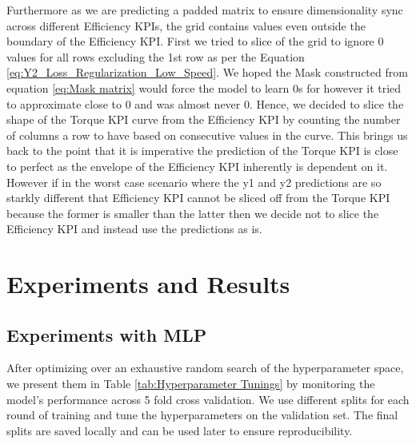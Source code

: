 \documentclass{report} %
\begin{document}
Furthermore as we are predicting a padded matrix to ensure dimensionality sync across different Efficiency \ac{KPI}s, the grid contains values even outside the boundary of the Efficiency \ac{KPI}.
First we tried to slice of the grid to ignore 0 values for all rows excluding the 1st row as per the Equation \ref{eq:Y2_Loss_Regularization_Low_Speed}.
We hoped the Mask constructed from equation \ref{eq:Mask matrix} would force the model to learn 0s for however it tried to approximate close to 0 and was almost never 0.
Hence, we decided to slice the shape of the Torque \ac{KPI} curve from the Efficiency \ac{KPI} by counting the number of columns a row to have based on consecutive values in the curve.
This brings us back to the point that it is imperative the prediction of the Torque \ac{KPI} is close to perfect as the envelope of the Efficiency \ac{KPI} inherently is dependent on it.
However if in the worst case scenario where the y1 and y2 predictions are so starkly different that Efficiency \ac{KPI} cannot be sliced off from 
the Torque \ac{KPI} because the former is smaller than the latter then we decide not to slice the Efficiency \ac{KPI} and instead use the predictions as is.

\newpage 
\newpage 

\chapter{Experiments and Results}

\section{Experiments with \ac{MLP}}\label{sec:Experiments with MLP}

After optimizing over an exhaustive random search of the hyperparameter space, we present them in Table \ref{tab:Hyperparameter Tunings} by monitoring the model's 
performance across 5 fold cross validation. We use different splits for each round of training and tune the hyperparameters on the validation set. 
The final splits are saved locally and can be used later to ensure reproducibility. 
\end{document}
